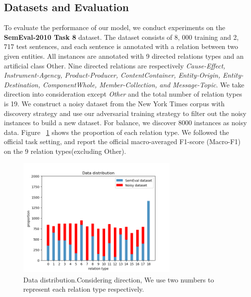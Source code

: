 \documentclass[conference]{IEEEtran}
\begin{document}
\subsection{Datasets and Evaluation}
\label{dataset}
To evaluate the performance of our model,
we conduct experiments on the \textbf{SemEval-2010 Task 8} dataset\cite{hendrickx2009semeval}.
The dataset consists of 8, 000 training and 2, 717 test sentences,
and each sentence is annotated with a relation between two given entities.
All instances are annotated with 9 directed relations types and an artificial class Other. 
Nine directed relations are respectively \textit{Cause-Effect, Instrument-Agency, Product-Producer, ContentContainer, Entity-Origin, Entity-Destination, ComponentWhole, Member-Collection, and Message-Topic}.
We take direction into consideration except \textit{Other} and the total number of relation types is 19. 
We construct a noisy dataset from the New York Times corpus with discovery strategy and use our adversarial training strategy to filter out the noisy instances to build a new dataset.
For balance, we discover 8000 instances as noisy data.
Figure ~\ref{Data distribution} shows the proportion of each relation type.
We followed the official task setting,  and report the official macro-averaged F1-score (Macro-F1) on the 9 relation types(excluding Other).
\begin{figure}[h]
  \centering
  \includegraphics[width=8cm, height=6cm]{Datadistribution.png}
  \caption{Data distribution.Considering direction, We use two numbers to represent 
  each relation type respectively.}
  \label{Data distribution}
\end{figure}
\end{document}
